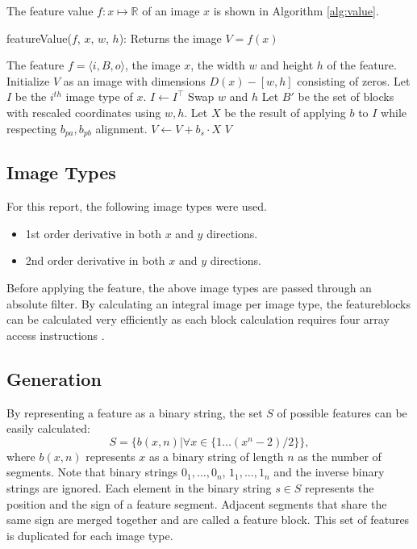 \documentclass[a4paper,11pt]{article}
\begin{document}
The feature value $f:x\mapsto\mathbb{R}$ of an image $x$ is shown in Algorithm
\ref{alg:value}.
\begin{algorithm}
	\caption{featureValue($f$, $x$, $w$, $h$): Returns the image $V = f(x)$}
	\begin{algorithmic}[1]
	\REQUIRE The feature $f = \langle i, B, o \rangle$, the image $x$, the width $w$ and height $h$ of the feature.
	\medskip
	\STATE Initialize $V$ as an image with dimensions $D(x)-[w, h]$ consisting of zeros.
	\STATE Let $I$ be the $i^{th}$ image type of $x$.
		\STATE $I \leftarrow I^\top$
		\STATE Swap $w$ and $h$
	\ENDIF
	\STATE Let $B'$ be the set of blocks with rescaled coordinates using $w,h$.
		\STATE Let $X$ be the result of applying $b$ to $I$ while respecting $b_{pa}, b_{pb}$ alignment.
		\STATE $V \leftarrow V + b_s \cdot X$
	\ENDFOR
	\RETURN $V$
	\end{algorithmic}
\label{alg:value}
\end{algorithm}

\subsection{Image Types} \label{sec:image}
For this report, the following image types were used.
\begin{itemize}
	\item{1st order derivative in both $x$ and $y$ directions.}
	\item{2nd order derivative in both $x$ and $y$ directions.}
\end{itemize}
Before applying the feature, the above image types are passed through an
absolute filter. By calculating an integral image per image type, the
featureblocks can be calculated very efficiently as each block calculation
requires four array access instructions \cite{viola}.

\subsection{Generation} \label{sec:gen}
By representing a feature as a binary string, the set $S$ of possible features
can be easily calculated:
$$S = \{b(x,n) | \forall x \in \{1\ldots(x^n-2)/2\}\},$$
where $b(x,n)$ represents $x$ as a binary string of length $n$ as the number of
segments. Note that binary strings $0_1,\ldots,0_n$, $1_1,\ldots,1_n$ and the
inverse binary strings are ignored. Each element in the binary string $s \in S$
represents the position and the sign of a feature segment. Adjacent segments
that share the same sign are merged together and are called a feature block.
This set of features is duplicated for each image type.
\end{document}
